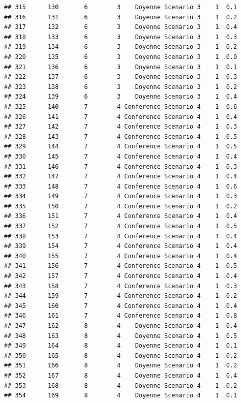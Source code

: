 \documentclass[
]{article}
\begin{document}
\begin{verbatim}
## 315      130       6        3    Doyenne Scenario 3    1  0.1
## 316      131       6        3    Doyenne Scenario 3    1  0.2
## 317      132       6        3    Doyenne Scenario 3    1  0.4
## 318      133       6        3    Doyenne Scenario 3    1  0.3
## 319      134       6        3    Doyenne Scenario 3    1  0.2
## 320      135       6        3    Doyenne Scenario 3    1  0.0
## 321      136       6        3    Doyenne Scenario 3    1  0.1
## 322      137       6        3    Doyenne Scenario 3    1  0.3
## 323      138       6        3    Doyenne Scenario 3    1  0.2
## 324      139       6        3    Doyenne Scenario 3    1  0.4
## 325      140       7        4 Conference Scenario 4    1  0.6
## 326      141       7        4 Conference Scenario 4    1  0.4
## 327      142       7        4 Conference Scenario 4    1  0.3
## 328      143       7        4 Conference Scenario 4    1  0.5
## 329      144       7        4 Conference Scenario 4    1  0.5
## 330      145       7        4 Conference Scenario 4    1  0.4
## 331      146       7        4 Conference Scenario 4    1  0.3
## 332      147       7        4 Conference Scenario 4    1  0.4
## 333      148       7        4 Conference Scenario 4    1  0.6
## 334      149       7        4 Conference Scenario 4    1  0.3
## 335      150       7        4 Conference Scenario 4    1  0.2
## 336      151       7        4 Conference Scenario 4    1  0.4
## 337      152       7        4 Conference Scenario 4    1  0.5
## 338      153       7        4 Conference Scenario 4    1  0.4
## 339      154       7        4 Conference Scenario 4    1  0.4
## 340      155       7        4 Conference Scenario 4    1  0.4
## 341      156       7        4 Conference Scenario 4    1  0.5
## 342      157       7        4 Conference Scenario 4    1  0.4
## 343      158       7        4 Conference Scenario 4    1  0.3
## 344      159       7        4 Conference Scenario 4    1  0.2
## 345      160       7        4 Conference Scenario 4    1  0.4
## 346      161       7        4 Conference Scenario 4    1  0.8
## 347      162       8        4    Doyenne Scenario 4    1  0.4
## 348      163       8        4    Doyenne Scenario 4    1  0.5
## 349      164       8        4    Doyenne Scenario 4    1  0.1
## 350      165       8        4    Doyenne Scenario 4    1  0.2
## 351      166       8        4    Doyenne Scenario 4    1  0.2
## 352      167       8        4    Doyenne Scenario 4    1  0.4
## 353      168       8        4    Doyenne Scenario 4    1  0.2
## 354      169       8        4    Doyenne Scenario 4    1  0.1

\end{verbatim}
\end{document}

